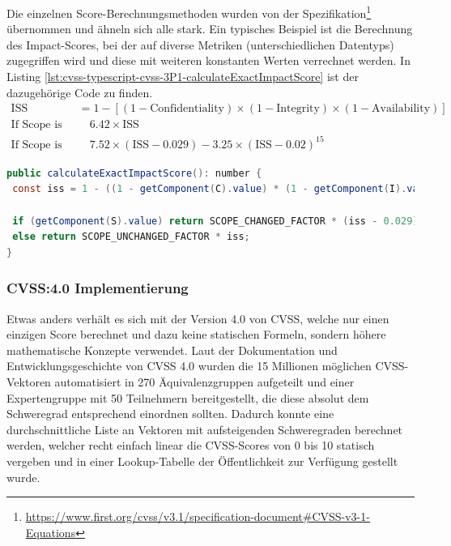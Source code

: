 Die einzelnen Score-Berechnungsmethoden wurden von der Spezifikation\footnote{\url{https://www.first.org/cvss/v3.1/specification-document\#CVSS-v3-1-Equations}} übernommen und ähneln sich alle stark.
Ein typisches Beispiel ist die Berechnung des Impact-Scores, bei der auf diverse Metriken (unterschiedlichen Datentyps) zugegriffen wird und diese mit weiteren konstanten Werten verrechnet werden.
In Listing \ref{lst:cvss-typescript-cvss-3P1-calculateExactImpactScore} ist der dazugehörige Code zu finden.
\begin{align*}
    \text{ISS} &= 1 - [ (1 - \text{Confidentiality}) \times (1 - \text{Integrity}) \times (1 - \text{Availability}) ] \\
    \text{If Scope is Unchanged:} & \quad 6.42 \times \text{ISS} \\
    \text{If Scope is Changed:} & \quad 7.52 \times (\text{ISS} - 0.029) - 3.25 \times (\text{ISS} - 0.02)^{15}
\end{align*}

\begin{lstlisting}[language=Java, label={lst:cvss-typescript-cvss-3P1-calculateExactImpactScore}, caption={CVSS 3.1 Impact Score-Berechnung in TypeScript}]
public calculateExactImpactScore(): number {
 const iss = 1 - ((1 - getComponent(C).value) * (1 - getComponent(I).value) * (1 - getComponent(A).value));

 if (getComponent(S).value) return SCOPE_CHANGED_FACTOR * (iss - 0.029) - 3.25 * Math.pow(iss - 0.02, 15);
 else return SCOPE_UNCHANGED_FACTOR * iss;
}
\end{lstlisting}

\subsubsection{CVSS:4.0 Implementierung} \label{subsec:projektbericht-loesungsweg-typescript-cvss-online-calculator-cvss-4P0}

Etwas anders verhält es sich mit der Version 4.0 von CVSS, welche nur einen einzigen Score berechnet und dazu keine statischen Formeln, sondern höhere mathematische Konzepte verwendet.
Laut der Dokumentation und Entwicklungsgeschichte von CVSS 4.0 \cite{CVSSv4.0Specification} wurden die 15 Millionen möglichen CVSS-Vektoren automatisiert in 270 Äquivalenzgruppen aufgeteilt und einer Expertengruppe mit 50 Teilnehmern bereitgestellt, die diese absolut dem Schweregrad entsprechend einordnen sollten.
Dadurch konnte eine durchschnittliche Liste an Vektoren mit aufsteigenden Schweregraden berechnet werden, welcher recht einfach linear die CVSS-Scores von 0 bis 10 statisch vergeben und in einer Lookup-Tabelle der Öffentlichkeit zur Verfügung gestellt wurde.

